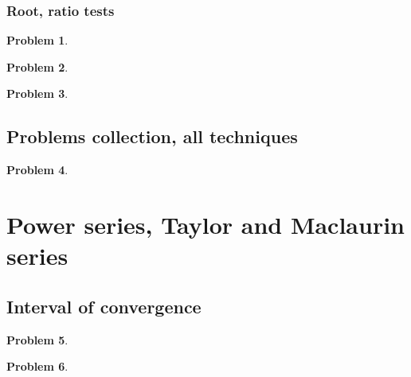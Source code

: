 \documentclass{article}
\newtheorem{problem}{Problem}
\begin{document}
\subsubsection{Root, ratio tests}
\begin{problem}

\end{problem}
\begin{problem}

\end{problem}


\begin{problem}

\end{problem}
\subsection{Problems collection, all techniques}
\begin{problem}

\end{problem}

\section{Power series, Taylor and Maclaurin series}
\subsection{Interval of convergence}
\begin{problem}

\end{problem}


\begin{problem}

\end{problem}
\end{document}

